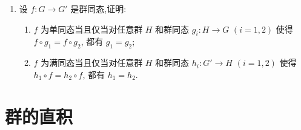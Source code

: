 \begin{enumerate}
\begin{enumerate}[label=(\arabic*)]
\item 试问若不要求$G$是Abel群, (2)中结论是否仍然成立?说明理由. (提示:可以利用习题1.4第6题中的例子.)
\end{enumerate}
\begin{proof}[解答]
\begin{enumerate}[label=(\arabic*)]
    \item 若$f$不是单射，即存在$a \in G$使得$a\ne0$且$f(a)=0$，
    因为$f$是满同态，存在$b \in G$使得$a=f(b)$，
    即$f(b)\ne0$且$f^2(b)=0$，以此类推可得严格升链
    \[0 \triangleleft \ker(f) \triangleleft \ker(f^2) \triangleleft \cdots 
    \triangleleft \ker(f^s) \triangleleft \cdots \triangleleft G,\]
    从而$G$不Noether。
    \item 若$f$不是满射，即存在$a \in G$使得$a\notin\operatorname{Im}(f)$，
    因为$f$是单同态，进而有$f(a)\notin\operatorname{Im}(f^2)$ 
    (不然$f(a)=f^2(b)$就有$a=f(b)$)，以此类推可得严格降链
    \[\cdots \triangleleft \operatorname{Im}(f^s) \triangleleft \cdots 
    \triangleleft \operatorname{Im}(f^2) 
    \triangleleft \operatorname{Im}(f) \triangleleft G,\]
    从而$G$不Artin。
    \item 不成立，取$G=A_\infty$是单群，
    单同态$f$把$(i_1 i_2 \cdots i_d)\cdots(j_1 j_2 \cdots j_r)$
    映成$(2i_1 \, 2i_2 \cdots 2i_d)\cdots(2j_1 \, 2j_2 \cdots 2j_r)$，
    易见$f$不是满的。\qedhere
\end{enumerate}
\end{proof}
\item 设 $f: G \rightarrow G'$ 是群同态,证明:
\begin{enumerate}[label=(\arabic*)]
\item $f$ 为单同态当且仅当对任意群 $H$ 和群同态 $g_i : H \rightarrow G$ $(i = 1,2)$ 使得 $f \circ g_1 = f \circ g_2$, 都有 $g_1 = g_2$;
\item $f$ 为满同态当且仅当对任意群 $H$ 和群同态 $h_i : G' \rightarrow H$ $(i = 1,2)$ 使得 $h_1 \circ f = h_2 \circ f$, 都有 $h_1 = h_2$.
\end{enumerate}
\end{enumerate}

\section{群的直积}

